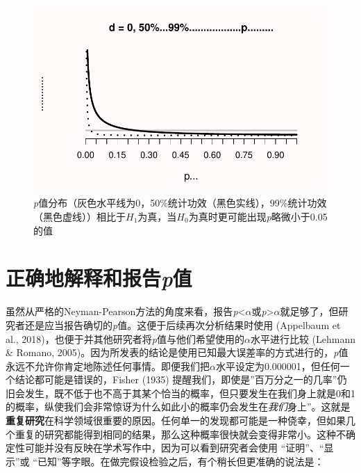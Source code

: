 \documentclass[
  letterpaper,
  DIV=11,
  numbers=noendperiod]{scrreprt}
\begin{document}
\begin{figure}

{\centering \includegraphics[width=1\textwidth,height=\textheight]{01-pvalue_files/figure-pdf/fig-paradox-1.pdf}

}

\caption{\label{fig-paradox}\emph{p}值分布（灰色水平线为0，50\%统计功效（黑色实线），99\%统计功效（黑色虚线））相比于\(H_1\)为真，当\(H_0\)为真时更可能出现\emph{p}略微小于0.05的值}

\end{figure}

\hypertarget{sec-correctlyinterpreting}{%
\section{\texorpdfstring{正确地解释和报告\emph{p}值}{正确地解释和报告p值}}\label{sec-correctlyinterpreting}}

虽然从严格的Neyman-Pearson方法的角度来看，报告\emph{p}\textless{}\(\alpha\)或\emph{p}\textgreater{}\(\alpha\)就足够了，但研究者还是应当报告确切的\emph{p}值。这便于后续再次分析结果时使用
(Appelbaum et al.,
2018)，也便于并其他研究者将\emph{p}值与他们希望使用的\(\alpha\)水平进行比较
(Lehmann \& Romano,
2005)。因为所发表的结论是使用已知最大误差率的方式进行的，\emph{p}值永远不允许你肯定地陈述任何事情。即便我们把\(\alpha\)水平设定为0.000001，但任何一个结论都可能是错误的，Fisher
(1935)
提醒我们，即使是''百万分之一的几率''仍旧会发生，既不低于也不高于其某个恰当的概率，但只要发生在我们身上就是0和1的概率，纵使我们会非常惊讶为什么如此小的概率仍会发生在\emph{我们}身上''。这就是\textbf{重复研究}在科学领域很重要的原因。任何单一的发现都可能是一种侥幸，但如果几个重复的研究都能得到相同的结果，那么这种概率很快就会变得非常小。这种不确定性可能并没有反映在学术写作中，因为可以看到研究者会使用
``证明''、``显示''或
``已知''等字眼。在做完假设检验之后，有个稍长但更准确的说法是：
\end{document}
